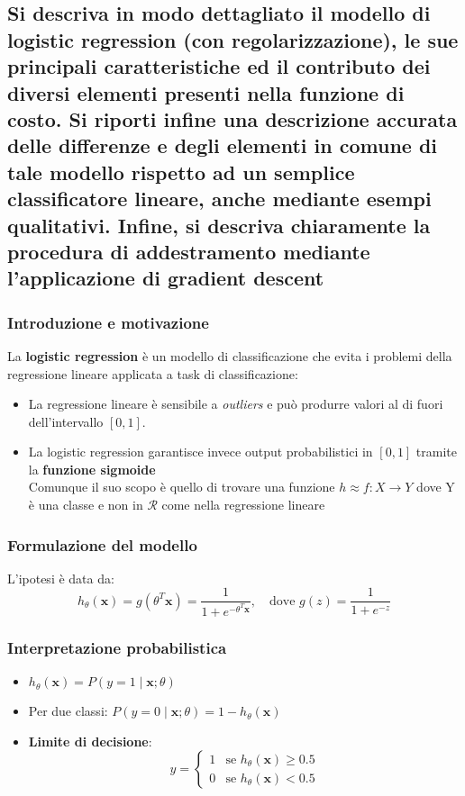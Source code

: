 \documentclass[10pt,oneside,a4paper]{article}
\begin{document}
	
	
	\subsection{Si descriva in modo dettagliato il
		modello di logistic regression (con regolarizzazione), le sue principali caratteristiche ed il contributo dei diversi elementi presenti nella funzione
		di costo. Si riporti infine una descrizione accurata delle differenze e degli elementi in comune di tale modello rispetto
		ad un semplice classificatore lineare, anche mediante esempi qualitativi. Infine, si descriva chiaramente la procedura di addestramento
		mediante l’applicazione di gradient descent}
		
	\subsubsection{Introduzione e motivazione}
	La \textbf{logistic regression} è un modello di classificazione che evita i problemi della regressione lineare applicata a task di classificazione:
	\begin{itemize}
		\item La regressione lineare è sensibile a \textit{outliers} e può produrre valori al di fuori dell'intervallo $[0,1]$.
		\item La logistic regression garantisce invece output probabilistici in $[0,1]$ tramite la \textbf{funzione sigmoide}\\
		Comunque il suo scopo è quello di trovare una funzione $h \approx f: X \to Y$ dove Y è una classe e non in $\mathcal{R}$ come nella regressione lineare
	\end{itemize}
	
	\subsubsection{Formulazione del modello}
	L'ipotesi è data da:
	\[
	h_\theta(\mathbf{x}) = g(\theta^T \mathbf{x}) = \frac{1}{1 + e^{-\theta^T \mathbf{x}}}, \quad \text{dove } g(z) = \frac{1}{1+e^{-z}}
	\]
	\subsubsection{Interpretazione probabilistica}
	\begin{itemize}
		\item $h_\theta(\mathbf{x}) = P(y=1 \mid \mathbf{x}; \theta)$
		\item Per due classi: $P(y=0 \mid \mathbf{x}; \theta) = 1 - h_\theta(\mathbf{x})$
		\item \textbf{Limite di decisione}: 
		\[
		y = 
		\begin{cases}
			1 & \text{se } h_\theta(\mathbf{x}) \geq 0.5 \\
			0 & \text{se } h_\theta(\mathbf{x}) < 0.5
		\end{cases}
		\]
	\end{itemize}
	
\end{document}
